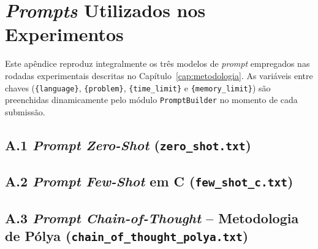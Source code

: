 \chapter{\texorpdfstring{\textit{Prompts}}{Prompts} Utilizados nos Experimentos}\label{ap:prompts}

Este apêndice reproduz integralmente os três modelos de \textit{prompt} empregados nas rodadas experimentais descritas no Capítulo~\ref{cap:metodologia}. As variáveis entre chaves (\texttt{\{language\}}, \texttt{\{problem\}}, \texttt{\{time\_limit\}} e \texttt{\{memory\_limit\}}) são preenchidas dinamicamente pelo módulo \texttt{PromptBuilder} no momento de cada submissão.

\section*{A.1 \textit{Prompt Zero-Shot} (\texttt{zero\_shot.txt})}

\begin{small}
\end{small}

\section*{A.2 \textit{Prompt Few-Shot} em C (\texttt{few\_shot\_c.txt})}

\begin{small}
\end{small}

\section*{A.3 \textit{Prompt Chain-of-Thought} -- Metodologia de Pólya (\texttt{chain\_of\_thought\_polya.txt})}

\begin{small}
\end{small}
